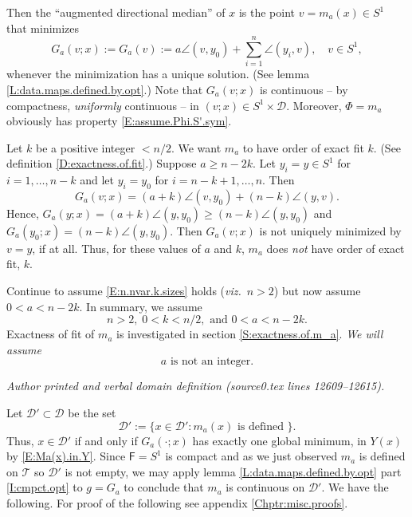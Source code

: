 \documentclass[10pt,a4paper]{amsart}
\newcommand{\D}{\mathcal{D}}
\newcommand{\msf}{\mathsf}
\newcommand{\F}{\msf{F}}
\newcommand{\T}{\mathcal{T}}
\begin{document}
Then the ``augmented directional median'' of $x$ is the point $v = m_{a}(x) \in S^{1}$ that minimizes
	\begin{equation}  \label{E:Ga.defn}
		G_{a}(v; x) := G_{a}(v) := a \angle(v, y_{0}) +  \sum_{i=1}^{n} \angle (y_{i}, v),  
		            \quad v \in S^{1},
	\end{equation}
whenever the minimization has a unique solution. (See lemma \ref{L:data.maps.defined.by.opt}.) 
Note that $G_{a}(v;x)$ is continuous -- by compactness, \emph{uniformly} continuous -- in $(v;x) \in S^{1} \times \D$. Moreover, $\Phi = m_{a}$ obviously has property \eqref{E:assume.Phi.S'.sym}.

Let $k$ be a positive integer $< n/2$. We want $m_{a}$ to have order of exact fit $k$. (See definition \ref{D:exactness.of.fit}.) Suppose $a \geq n-2k$. 
Let $y_{i} = y \in S^{1}$ for $i = 1, \ldots, n-k$ and let $y_{i} = y_{0}$ for $i = n-k+1, \ldots, n$. Then
    \begin{equation*}
        G_{a}(v; x) = (a + k) \angle(v, y_{0}) + (n-k) \angle (y, v).
    \end{equation*}
Hence, $G_{a}(y; x) = (a + k) \angle(y, y_{0}) \geq (n-k) \angle(y, y_{0})$ 
and $G_{a}(y_{0}; x) = (n-k) \angle(y, y_{0})$. Then $G_{a}(v; x)$ is not uniquely minimized by $v = y$, if at all. Thus, for these values of $a$ and $k$, $m_{a}$ does \emph{not} have order of exact fit, $k$.

Continue to assume \eqref{E:n.nvar.k.sizes} holds (\emph{viz.}\ $n > 2$) but now assume $0 < a < n-2k$. In summary, we assume
	\begin{equation}  \label{E:ma.n.k.a.sizes}
	n > 2, \; 0 < k < n/2, \text{ and } 0 < a < n-2k.
	\end{equation}
Exactness of fit of $m_{a}$ is investigated in section \ref{S:exactness.of.m_a}. 
\emph{We will assume}
	\begin{equation}   \label{E:.for.aug.median.a.not.integer}
		a \text{ is not an integer.}
	\end{equation}
\par\medskip\noindent\textit{Author printed and verbal domain definition (source0.tex lines 12609--12615).}\par\smallskip
Let $\D' \subset \D$ be the set 
    \begin{equation}   \label{E:ma.D'.defn}
         \D' := \bigl\{ x \in \D' : m_{a}(x) \text{ is defined } \bigr\} .
    \end{equation}
Thus, $x \in \D'$ if and only if $G_{a}(\cdot ; x)$ has exactly one global minimum, 
in $Y(x)$ by \eqref{E:Ma(x).in.Y}. Since $\F = S^{1}$ is compact and as we just observed $m_{a}$ is defined on $\T$ so $\D'$ is not empty, we may apply lemma \ref{L:data.maps.defined.by.opt} part \ref{I:cmpct.opt} to $g = G_{a}$ to conclude that 
$m_{a}$ is continuous on $\D'$. We have the following. For proof of the following see appendix \ref{Chptr:misc.proofs}.
\end{document}
